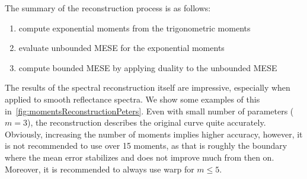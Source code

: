 The summary of the reconstruction process is as follows:
\begin{enumerate}
	\item compute exponential moments from the trigonometric moments
	\item evaluate unbounded MESE for the exponential moments
	\item compute bounded MESE by applying duality to the unbounded MESE
\end{enumerate}

The results of the spectral reconstruction itself are impressive, especially when applied to smooth reflectance spectra. We show some examples of this in~\cref{fig:momentsReconstructionPeters}. Even with small number of parameters ($m=3$), the reconstruction describes the original curve quite accurately. Obviously, increasing the number of moments implies higher accuracy, however, it is not recommended to use over 15 moments, as that is roughly the boundary where the mean error stabilizes and does not improve much from then on. Moreover, it is recommended to always use warp for $m \le 5$.

